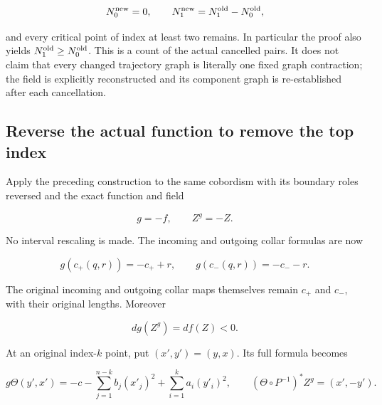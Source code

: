\begin{equation}
N_0^{\rm new}=0,\qquad
 N_1^{\rm new}=N_1^{\rm old}-N_0^{\rm old},
 \label{courseIII:removing-the-original-zero-and-top-handles:eq:3.4}
\end{equation}

and every critical point of index at least two remains. In particular the proof also yields \(N_1^{\rm old}\geq N_0^{\rm old}\). This is a count of the actual cancelled pairs. It does not claim that every changed trajectory graph is literally one fixed graph contraction; the field is explicitly reconstructed and its component graph is re-established after each cancellation.

\subsection{Reverse the actual function to remove the top index}
\label{courseIII:removing-the-original-zero-and-top-handles:zero-dual-top}

\label{courseIII:removing-the-original-zero-and-top-handles:section-4}\label{courseIII:zero-top:4}

Apply the preceding construction to the same cobordism with its boundary roles reversed and the exact function and field

\begin{equation}
g=-f,\qquad Z^g=-Z.
 \label{courseIII:removing-the-original-zero-and-top-handles:eq:4.1}
\end{equation}

No interval rescaling is made. The incoming and outgoing collar formulas are now

\begin{equation}
g(c_+(q,r))=-c_++r,\qquad
 g(c_-(q,r))=-c_--r.
 \label{courseIII:removing-the-original-zero-and-top-handles:eq:4.2}
\end{equation}

The original incoming and outgoing collar maps themselves remain \(c_+\) and \(c_-\), with their original lengths. Moreover

\begin{equation}
dg(Z^g)=df(Z)<0.
 \label{courseIII:removing-the-original-zero-and-top-handles:eq:4.3}
\end{equation}

At an original index-\(k\) point, put \((x',y')=(y,x)\). Its full formula becomes

\begin{equation}
g\Theta(y',x')
 =-c-\sum_{j=1}^{n-k}b_j(x'_j)^2
       +\sum_{i=1}^{k}a_i(y'_i)^2,
 \qquad
 (\Theta\circ P^{-1})^*Z^g=(x',-y').
 \label{courseIII:removing-the-original-zero-and-top-handles:eq:4.4}
\end{equation}

